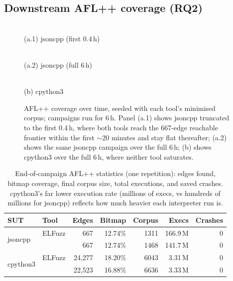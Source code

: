 \subsection{Downstream AFL++ coverage (RQ2)}
\label{sec:eval-rq2}

\begin{figure}[H]
    \centering
    \begin{minipage}[t]{0.32\linewidth}\centering
        \\[2pt]
        {\small (a.1) jsoncpp (first 0.4\,h)}
    \end{minipage}\hfill
    \begin{minipage}[t]{0.32\linewidth}\centering
        \\[2pt]
        {\small (a.2) jsoncpp (full 6\,h)}
    \end{minipage}\hfill
    \begin{minipage}[t]{0.32\linewidth}\centering
        \\[2pt]
        {\small (b) cpython3}
    \end{minipage}
    \caption{AFL++ coverage over time, seeded with each tool's minimised corpus; campaigns run for 6\,h. Panel (a.1) shows jsoncpp truncated to the first 0.4\,h, where both tools reach the 667-edge reachable frontier within the first $\sim$20 minutes and stay flat thereafter; (a.2) shows the same jsoncpp campaign over the full 6\,h; (b) shows cpython3 over the full 6\,h, where neither tool saturates.}
    \label{fig:afl}
\end{figure}

\begin{table}[h]
    \centering
    \begin{tabular}{llrrrrr}
        \toprule
        \textbf{SUT} & \textbf{Tool} & \textbf{Edges} & \textbf{Bitmap} & \textbf{Corpus} & \textbf{Execs} & \textbf{Crashes} \\
        \midrule
        \multirow{2}{*}{jsoncpp}
          & ELFuzz     & 667 & 12.74\% & 1311 & 166.9\,M & 0 \\
          & \toolname{} & 667 & 12.74\% & 1468 & 141.7\,M & 0 \\
        \midrule
        \multirow{2}{*}{cpython3}
          & ELFuzz     & 24{,}277 & 18.20\% & 6043 & 3.31\,M & 0 \\
          & \toolname{} & 22{,}523 & 16.88\% & 6636 & 3.33\,M & 0 \\
        \bottomrule
    \end{tabular}
    \caption{End-of-campaign AFL++ statistics (one repetition): edges found, bitmap coverage, final corpus size, total executions, and saved crashes. cpython3's far lower execution rate (millions of execs, vs hundreds of millions for jsoncpp) reflects how much heavier each interpreter run is.}
    \label{tab:aflstats}
\end{table}

